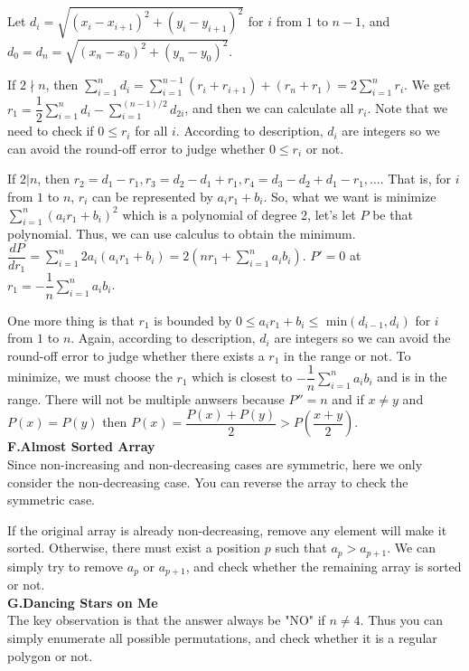 \documentclass[14pt,a4paper]{article}
\begin{document}
Let $d_i=\sqrt{(x_i-x_{i+1})^2+(y_i-y_{i+1})^2}$ for $i$ from $1$ to $n-1$, and $d_0=d_n=\sqrt{(x_n-x_0)^2+(y_n-y_0)^2}$. 

If $2\nmid n$, then $\sum\limits_{i=1}^{n}d_i=\sum\limits_{i=1}^{n-1}(r_i+r_{i+1})+(r_n+r_1)=2\sum\limits_{i=1}^{n}r_i$.
We get $r_1=\dfrac{1}{2}\sum\limits_{i=1}^{n}d_i-\sum\limits_{i=1}^{(n-1)/2}d_{2i}$, and then we can calculate all $r_i$.
Note that we need to check if $0\le r_i$ for all $i$. 
According to description, $d_i$ are integers so we can avoid the round-off error to judge whether $0\le r_i$ or not. 

If $2|n$, then $r_2=d_1-r_1, r_3=d_2-d_1+r_1, r_4=d_3-d_2+d_1-r_1, \ldots$. 
That is, for $i$ from $1$ to $n$, $r_i$ can be represented by $a_ir_1+b_i$. 
So, what we want is minimize $\sum\limits_{i=1}^{n}(a_ir_1+b_i)^2$ which is a polynomial of degree 2, let's let $P$ be that polynomial.
Thus, we can use calculus to obtain the minimum. $\dfrac{dP}{dr_1}=\sum\limits_{i=1}^{n}2a_i(a_ir_1+b_i)=2(nr_1+\sum\limits_{i=1}^{n}a_ib_i)$. 
$P'=0$ at $r_1=-\dfrac{1}{n}\sum\limits_{i=1}^{n}a_ib_i$.

One more thing is that $r_1$ is bounded by $0\le a_ir_1+b_i \le \text{ min}(d_{i-1},d_{i})$ for $i$ from $1$ to $n$.
Again, according to description, $d_i$ are integers so we can avoid the round-off error to judge whether there exists a $r_1$ in the range or not. 
To minimize, we must choose the $r_1$ which is closest to $-\dfrac{1}{n}\sum\limits_{i=1}^{n}a_ib_i$ and is in the range. 
There will not be multiple anwsers because $P''=n$ and if $x\neq y$ and $P(x)=P(y)$ then $P(x)=\dfrac{P(x)+P(y)}{2} > P(\dfrac{x+y}{2})$.\\

{\Large \bf F.Almost Sorted Array}\\

Since non-increasing and non-decreasing cases are symmetric,
here we only consider the non-decreasing case.
You can reverse the array to check the symmetric case.

If the original array is already non-decreasing, remove any element will make it sorted.
Otherwise, there must exist a position $p$ such that $a_p > a_{p+1}$.
We can simply try to remove $a_p$ or $a_{p+1}$, and check whether the remaining array is sorted or not.
\\

{\Large \bf G.Dancing Stars on Me}\\

The key observation is that the answer always be "NO" if $n \ne 4$.
Thus you can simply enumerate all possible permutations,
and check whether it is a regular polygon or not.
\\
\end{document}
